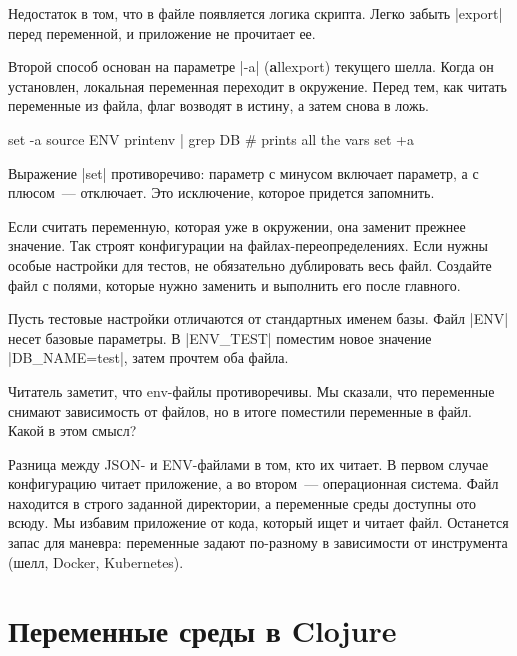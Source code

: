 Недостаток в том, что в файле появляется логика скрипта. Легко забыть
\spverb|export| перед переменной, и приложение не прочитает ее.

Второй способ основан на параметре \spverb|-a| (\textbf{a}llexport) текущего
шелла. Когда он установлен, локальная переменная переходит в окружение. Перед
тем, как читать переменные из файла, флаг возводят в истину, а затем снова в
ложь.

\begin{english}
  \begin{bash}
set -a
source ENV
printenv | grep DB
# prints all the vars
set +a
  \end{bash}
\end{english}

Выражение \spverb|set| противоречиво: параметр с минусом включает параметр, а с
плюсом~--- отключает. Это исключение, которое придется запомнить.

Если считать переменную, которая уже в окружении, она заменит прежнее
значение. Так строят конфигурации на файлах-переопределениях. Если нужны особые
настройки для тестов, не обязательно дублировать весь файл. Создайте файл с
полями, которые нужно заменить и выполнить его после главного.

Пусть тестовые настройки отличаются от стандартных именем базы. Файл
\spverb|ENV| несет базовые параметры. В \spverb|ENV_TEST| поместим новое
значение \spverb|DB_NAME=test|, затем прочтем оба файла.

\begin{english}
\end{english}

Читатель заметит, что env-файлы противоречивы. Мы сказали, что переменные
снимают зависимость от файлов, но в итоге поместили переменные в файл. Какой в
этом смысл?

Разница между JSON- и ENV-файлами в том, кто их читает. В первом случае
конфигурацию читает приложение, а во втором~--- операционная система. Файл
находится в строго заданной директории, а переменные среды доступны ото
всюду. Мы избавим приложение от кода, который ищет и читает файл. Останется
запас для маневра: переменные задают по-разному в зависимости от инструмента
(шелл, Docker, Kubernetes).

\section{Переменные среды в Clojure}

